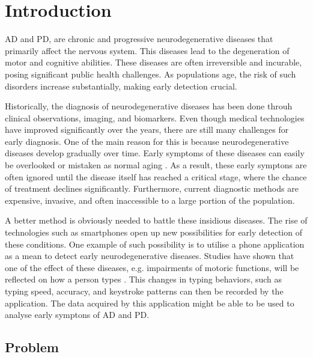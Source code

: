 \chapter{Introduction}


\ac{AD} and \ac{PD}, are chronic and progressive neurodegenerative diseases that primarily affect the nervous system.
This diseases lead to the degeneration of motor and cognitive abilities.
These diseases are often irreversible and incurable, posing significant public health challenges.
As populations age, the risk of such disorders increase substantially, making early detection crucial.

Historically, the diagnosis of neurodegenerative diseases has been done throuh clinical observations, imaging, and biomarkers.
Even though medical technologies have improved significantly over the years, there are still many challenges for early diagnosis.
One of the main reason for this is because neurodegenerative diseases develop gradually over time.
Early symptoms of these diseases can easily be overlooked or mistaken as normal aging \cite{manera2023}.
As a result, these early symptons are often ignored until the disease itself has reached a critical stage, where the chance of treatment declines significantly. 
Furthermore, current diagnostic methods are expensive, invasive, and often inaccessible to a large portion of the population.

A better method is obviously needed to battle these insidious diseases.
The rise of technologies such as smartphones open up new possibilities for early detection of these conditions.
One example of such possibility is to utilise a phone application as a mean to detect early neurodegenerative diseases.
Studies have shown that one of the effect of these diseases, e.g. impairments of motoric functions, will be reflected on how a person types \cite{mcisaac2023}.
This changes in typing behaviors, such as typing speed, accuracy, and keystroke patterns can then be recorded by the application.
The data acquired by this application might be able to be used to analyse early symptons of \ac{AD} and \ac{PD}.

\section{Problem}


